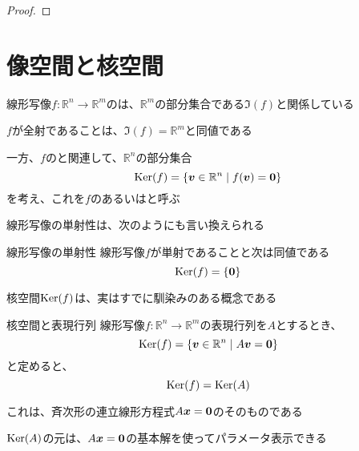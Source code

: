 \documentclass[../../../topic_linear-algebra]{subfiles}
\begin{document}
\begin{proof}
\end{proof}

\sectionline
\section{像空間と核空間}

線形写像$f\colon \mathbb{R}^n \to \mathbb{R}^m$のは、$\mathbb{R}^m$の部分集合である$\Im(f)$と関係している

$f$が全射であることは、$\Im(f) = \mathbb{R}^m$と同値である

\sectionline

一方、$f$のと関連して、$\mathbb{R}^n$の部分集合
\begin{equation*}
  \operatorname{Ker}(f) = \{ \vb*{v} \in \mathbb{R}^n \mid f(\vb*{v}) = \vb*{0} \}
\end{equation*}
を考え、これを$f$のあるいはと呼ぶ

\br

線形写像の単射性は、次のようにも言い換えられる

\begin{theorem}{線形写像の単射性}
  線形写像$f$が単射であることと次は同値である
  \begin{equation*}
    \operatorname{Ker}(f) = \{ \vb*{0} \}
  \end{equation*}
\end{theorem}

\sectionline

核空間$\operatorname{Ker}(f)$は、実はすでに馴染みのある概念である

\begin{theorem}{核空間と表現行列}
  線形写像$f\colon \mathbb{R}^n \to \mathbb{R}^m$の表現行列を$A$とするとき、
  \begin{equation*}
    \operatorname{Ker}(f) = \{ \vb*{v} \in \mathbb{R}^n \mid A\vb*{v} = \vb*{0} \}
  \end{equation*}
  と定めると、
  \begin{equation*}
    \operatorname{Ker}(f) = \operatorname{Ker}(A)
  \end{equation*}
\end{theorem}

これは、斉次形の連立線形方程式$A\vb*{x} = \vb*{0}$のそのものである

\br

$\operatorname{Ker}(A)$の元は、$A\vb*{x} = \vb*{0}$の基本解を使ってパラメータ表示できる
\end{document}
